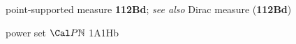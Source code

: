 














point-supported measure {\bf 112Bd};
  {\it see also} Dirac measure ({\bf 112Bd})








































































{power set $\Cal P\Bbb N$ }
1A1Hb
























